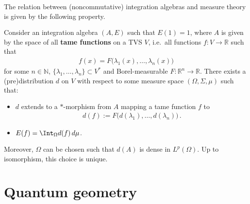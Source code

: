     The relation between (noncommutative) integration algebras and measure theory is given by the following property.
    \begin{property}
        Consider an integration algebra $(A,E)$ such that $E(1)=1$, where $A$ is given by the space of all \textbf{tame functions} on a TVS $V$, i.e.~all functions $f:V\rightarrow\mathbb{R}$ such that
        \begin{gather}
            f(x) = F\bigl(\lambda_1(x),\ldots,\lambda_n(x)\bigr)
        \end{gather}
        for some $n\in\mathbb{N}$, $\{\lambda_1,\ldots,\lambda_n\}\subset V^*$ and Borel-measurable $F:\mathbb{R}^n\rightarrow\mathbb{R}$. There exists a (pre)distribution $d$ on $V$ with respect to some measure space $(\Omega,\Sigma,\mu)$ such that:
        \begin{itemize}
            \item $d$ extends to a $\ast$-morphism from $A$ mapping a tame function $f$ to
            \begin{gather}
                d(f) := F\bigl(d(\lambda_1),\ldots,d(\lambda_n)\bigr)\,.
            \end{gather}
            \item $E(f)=\Int_\Omega d(f)\,d\mu$.
        \end{itemize}
        Moreover, $\Omega$ can be chosen such that $d(A)$ is dense in $L^p(\Omega)$. Up to isomorphism, this choice is unique.
    \end{property}


\section{Quantum geometry}



